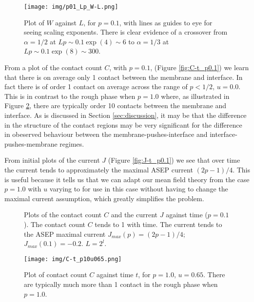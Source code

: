 \documentclass[a4paper,10pt]{article}
\newcommand{\fref}[1]{Figure \ref{#1}}
\newcommand{\sref}[1]{Section \ref{#1}}
\begin{document}
\begin{figure}[h!]
 \centering
 \texttt{[image: img/p01\_Lp\_W-L.png]}
 \caption{Plot of $W$ against $L$, for $p = 0.1$, with lines as guides to eye for seeing scaling exponents. There is clear evidence of a crossover from $\alpha = 1/2$ at $Lp \sim 0.1 \exp(4) \sim 6$ to $\alpha = 1/3$ at $Lp \sim 0.1 \exp(8) \sim 300$.}
 \label{fig:W-L}
\end{figure}

From a plot of the contact count $C$, with $p=0.1$, (\fref{fig:C-t_p0.1}) we learn that there is on average only 1 contact between the membrane and interface. In fact there is of order 1 contact on average across the range of $p<1/2$, $u = 0.0$. This is in contrast to the rough phase when $p=1.0$ where, as illustrated in \fref{fig:C-t_p1.0u0.65}, there are typically order 10 contacts between the membrane and interface. As is discussed in \sref{sec:discussion}, it may be that the difference in the structure of the contact regions may be very significant for the difference in obeserved behaviour between the membrane-pushes-interface and interface-pushes-membrane regimes.

From initial plots of the current $J$ (\fref{fig:J-t_p0.1}) we see that over time the current tends to approximately the maximal ASEP current $(2p-1)/4$. This is useful because it tells us that we can adapt our mean field theory from the case $p = 1.0$ with $u$ varying to for use in this case without having to change the maximal current assumption, which greatly simplifies the problem.

\begin{figure}[h!]
  \centering
  \caption{Plots of the contact count $C$ and the current $J$ against time ($p = 0.1$). The contact count $C$ tends to 1 with time. The current tends to the ASEP maximal current $J_{max}(p) = (2p-1)/4$; $J_{max}(0.1) = -0.2$. $L = 2^l$.}
\end{figure}

\begin{figure}[h!]
 \centering
 \texttt{[image: img/C-t\_p10u065.png]}
 \caption{Plot of contact count $C$ against time $t$, for $p=1.0$, $u = 0.65$. There are typically much more than 1 contact in the rough phase when $p=1.0$.}
 \label{fig:C-t_p1.0u0.65}
\end{figure}
\end{document}
